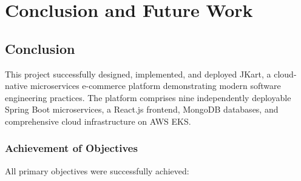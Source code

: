\chapter{Conclusion and Future Work}

\section{Conclusion}

This project successfully designed, implemented, and deployed JKart, a cloud-native microservices e-commerce platform demonstrating modern software engineering practices. The platform comprises nine independently deployable Spring Boot microservices, a React.js frontend, MongoDB databases, and comprehensive cloud infrastructure on AWS EKS.

\subsection{Achievement of Objectives}

All primary objectives were successfully achieved:


